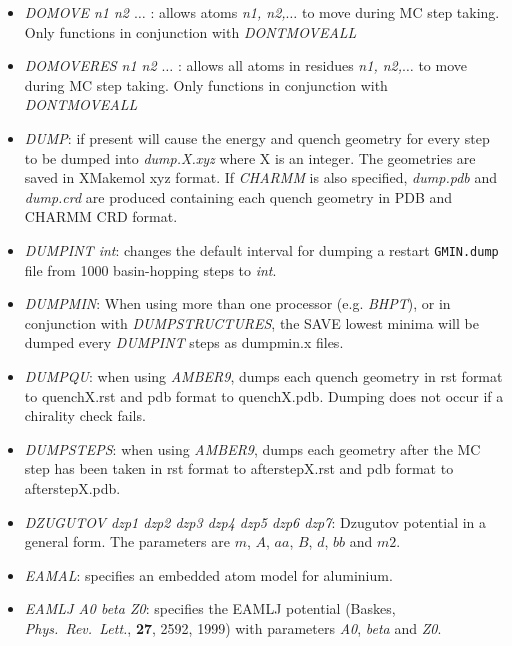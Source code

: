 \documentclass[12pt,a4paper,dvips]{article}
\begin{document}
\begin{itemize}
\item {\it DOMOVE n1 n2 $\ldots$ \/}: allows atoms {\it n1, n2,$\ldots$} to move during MC step taking. Only functions in conjunction with 
{\it DONTMOVEALL\/}

\item {\it DOMOVERES n1 n2 $\ldots$ \/}: allows all atoms in residues {\it n1, n2,$\ldots$} to move during MC step taking. Only functions in conjunction 
with {\it DONTMOVEALL\/}

\item {\it DUMP\/}: if present will cause the energy and quench geometry for every step
to be dumped into {\it dump.X.xyz\/} where X is an integer. The geometries are saved 
in XMakemol xyz format. If {\it CHARMM\/} is also specified, {\it dump.pdb\/} and {\it dump.crd\/}
are produced containing each quench geometry in PDB and CHARMM CRD format.

\item {\it DUMPINT int\/}: changes the default interval for dumping a restart 
{\tt GMIN.dump} file from 1000 basin-hopping steps to {\it int\/}.

\item {\it DUMPMIN\/}: When using more than one processor (e.g. {\it BHPT\/}), or in conjunction with {\it DUMPSTRUCTURES\/}, the SAVE lowest minima will be dumped every 
{\it DUMPINT\/} steps as dumpmin.x files. 

\item {\it DUMPQU\/}: when using {\it AMBER9\/}, dumps each quench geometry in rst format to quenchX.rst 
and pdb format to quenchX.pdb. Dumping does not occur if a chirality check fails.

\item {\it DUMPSTEPS\/}: when using {\it AMBER9\/}, dumps each geometry after the MC step has been taken in rst format to afterstepX.rst 
and pdb format to afterstepX.pdb. 

\item {\it DZUGUTOV dzp1 dzp2 dzp3 dzp4 dzp5 dzp6 dzp7\/}: Dzugutov potential in a general form.
The parameters are $m$, $A$, $aa$, $B$, $d$, $bb$ and $m2$.

\item {\it EAMAL}: specifies an embedded atom model for aluminium.

\item {\it EAMLJ A0 beta Z0\/}: specifies the EAMLJ potential (Baskes, {\it Phys.~Rev.~Lett.\/},
{\bf 27}, 2592, 1999) with parameters {\it A0\/}, {\it beta\/} and {\it Z0\/}.


\end{itemize}
\end{document}
